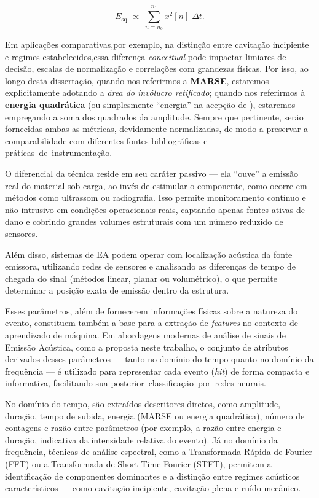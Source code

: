 \begin{equation}
	\label{eq:energia}
	E_\text{sq} \;\propto\; \sum_{n=n_0}^{n_1} x^2[n] \;\Delta t.
\end{equation}

Em aplicações comparativas,por exemplo, na distinção entre cavitação incipiente e regimes estabelecidos,essa diferença \textit{conceitual} pode impactar limiares de decisão, escalas de normalização e correlações com grandezas físicas. Por isso, ao longo desta dissertação, quando nos referirmos a \textbf{MARSE}, estaremos explicitamente adotando a \textit{área do invólucro retificado}; quando nos referirmos à \textbf{energia quadrática} (ou simplesmente “energia” na acepção de ), estaremos empregando a soma dos quadrados da amplitude. Sempre que pertinente, serão fornecidas ambas as métricas, devidamente normalizadas, de modo a preservar a comparabilidade com diferentes fontes bibliográficas e práticas~de~instrumentação.


O diferencial da técnica reside em seu caráter passivo — ela ``ouve'' a emissão real do material sob carga, ao invés de estimular o componente, como ocorre em métodos como ultrassom ou radiografia. Isso permite monitoramento contínuo e não intrusivo em condições operacionais reais, captando apenas fontes ativas de dano e cobrindo grandes volumes estruturais com um número reduzido de sensores.

Além disso, sistemas de EA podem operar com localização acústica da fonte emissora, utilizando redes de sensores e analisando as diferenças de tempo de chegada do sinal (métodos linear, planar ou volumétrico), o que permite determinar a posição exata de emissão dentro da estrutura.

Esses parâmetros, além de fornecerem informações físicas sobre a natureza do evento, constituem também a base para a extração de \textit{features} no contexto de aprendizado de máquina. Em abordagens modernas de análise de sinais de Emissão Acústica, como a proposta neste trabalho, o conjunto de atributos derivados desses parâmetros — tanto no domínio do tempo quanto no domínio da frequência — é utilizado para representar cada evento (\textit{hit}) de forma compacta e informativa, facilitando sua posterior~classificação~por~redes neurais.

No domínio do tempo, são extraídos descritores diretos, como amplitude, duração, tempo de subida, energia (MARSE ou energia quadrática), número de contagens e razão entre parâmetros (por exemplo, a razão entre energia e duração, indicativa da intensidade relativa do evento). Já no domínio da frequência, técnicas de análise espectral, como a Transformada Rápida de Fourier (FFT) ou a Transformada de Short-Time Fourier (STFT), permitem a identificação de componentes dominantes e a distinção entre regimes acústicos característicos — como cavitação incipiente, cavitação plena e ruído mecânico.

